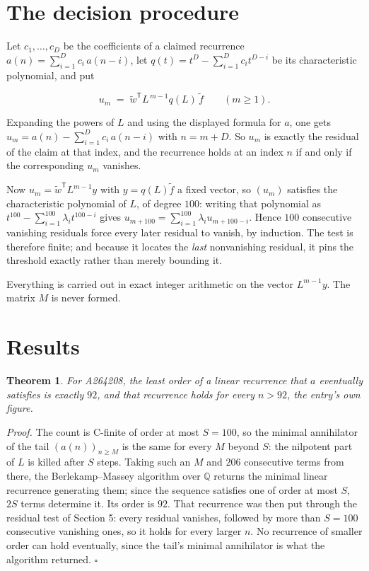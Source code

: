 \documentclass[11pt]{article}
\newtheorem{theorem}{Theorem}
\theoremstyle{definition}
\begin{document}
\section{The decision procedure}

Let $c_1,\dots,c_D$ be the coefficients of a claimed recurrence $a(n) = \sum_{i=1}^{D} c_i\,a(n-i)$, let $q(t) = t^{D} - \sum_{i=1}^{D} c_i t^{D-i}$ be its characteristic polynomial, and put

\[u_m \;=\; \tilde w^{\mathsf T} L^{\,m-1} q(L)\,\tilde f \qquad (m \ge 1).\]

Expanding the powers of $L$ and using the displayed formula for $a$, one gets $u_m = a(n) - \sum_{i=1}^{D} c_i\,a(n-i)$ with $n = m + D$. So $u_m$ is exactly the residual of the claim at that index, and the recurrence holds at an index $n$ if and only if the corresponding $u_m$ vanishes.

Now $u_m = \tilde w^{\mathsf T} L^{m-1} y$ with $y = q(L)\tilde f$ a fixed vector, so $(u_m)$ satisfies the characteristic polynomial of $L$, of degree $100$: writing that polynomial as $t^{100} - \sum_{i=1}^{100} \lambda_i t^{100-i}$ gives $u_{m+100} = \sum_{i=1}^{100} \lambda_i u_{m+100-i}$. Hence $100$ consecutive vanishing residuals force every later residual to vanish, by induction. The test is therefore finite; and because it locates the {\itshape last} nonvanishing residual, it pins the threshold exactly rather than merely bounding it.

Everything is carried out in exact integer arithmetic on the vector $L^{m-1}y$. The matrix $M$ is never formed.

\section{Results}

\begin{theorem} For A264208, the least order of a linear recurrence that $a$ eventually satisfies is exactly $92$, and that recurrence holds for every $n > 92$, the entry's own figure.\end{theorem}

{\itshape Proof.} The count is C-finite of order at most $S = 100$, so the minimal annihilator of the tail $(a(n))_{n \ge M}$ is the same for every $M$ beyond $S$: the nilpotent part of $L$ is killed after $S$ steps. Taking such an $M$ and $206$ consecutive terms from there, the Berlekamp--Massey algorithm over $\mathbb{Q}$ returns the minimal linear recurrence generating them; since the sequence satisfies one of order at most $S$, $2S$ terms determine it. Its order is $92$. That recurrence was then put through the residual test of Section 5: every residual vanishes, followed by more than $S = 100$ consecutive vanishing ones, so it holds for every larger $n$. No recurrence of smaller order can hold eventually, since the tail's minimal annihilator is what the algorithm returned. $\square$
\end{document}
